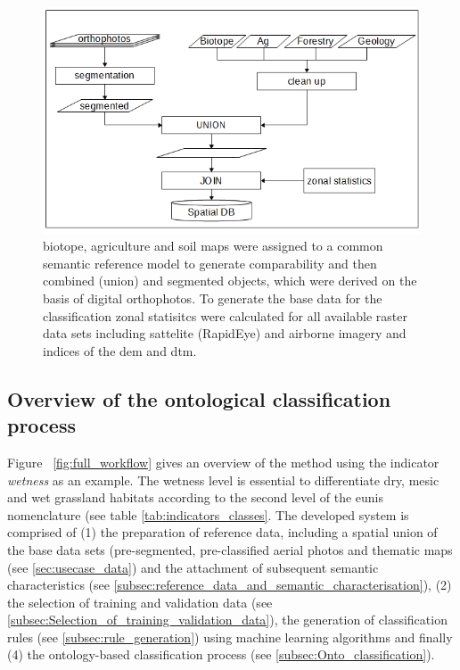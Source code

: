 \documentclass[authoryear,review,12pt,number]{elsarticle}
\begin{document}
\begin{figure} \includegraphics[width=1\textwidth]{diagrams/pre_processing.png}
    \caption{biotope, agriculture and soil maps were assigned to a
    common semantic reference model to generate comparability and then combined (union)
    and segmented objects, which were derived on the basis of digital
    orthophotos. To generate the base data for the classification zonal
    statisitcs were calculated for all available raster data sets including
    sattelite (RapidEye) and airborne imagery and indices of the \gls{dem} and
    \gls{dtm}.
    \label{fig:pre-processing}}
\end{figure}


\subsection{Overview of the ontological classification process}
\label{subsec:method_overview}
Figure ~\ref{fig:full_workflow} gives an overview of the method using the
indicator \textit{wetness} as an example. The wetness level is essential to
differentiate dry, mesic and wet grassland habitats according to the second
level of the \gls{eunis} nomenclature (see table \ref{tab:indicators_classes}.
The developed system is comprised of (1) the preparation of reference
data, including a spatial union of the base data sets (pre-segmented,
pre-classified aerial photos and thematic maps (see
\ref{sec:usecase_data}) and the attachment of
subsequent semantic characteristics (see 
\ref{subsec:reference_data_and_semantic_characterisation}), (2)
the selection of training and validation data (see
\ref{subsec:Selection_of_training_validation_data}), the generation of
classification rules (see 
\ref{subsec:rule_generation}) using machine learning algorithms and
finally (4) the ontology-based classification process (see \ref{subsec:Onto_classification}). 
\end{document}
